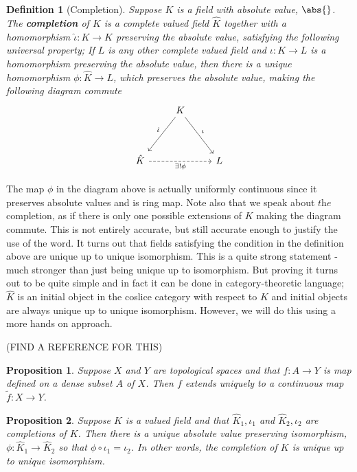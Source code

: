 \documentclass{article}
\newtheorem{definition}{Definition}[section]
\newtheorem{proposition}{Proposition}[section]
\begin{document}
\begin{definition}[Completion]
    Suppose $K$ is a field with absolute value, $\abs{}$. The \textbf{completion} of $K$ is a complete valued field $\hat K$ together with a homomorphism $\hat \iota : K \to \hat K$ preserving the absolute value, satisfying the following universal property; If $L$ is any other complete valued field and $\iota : K \to L$ is a homomorphism preserving the absolute value, then there is a unique homomorphism $\phi : \hat K \to L$, which preserves the absolute value, making the following diagram commute
    \[\begin{tikzcd}
        & K \\
        \\
        \hat K && L
        \arrow["{\exists! \phi}"', dashed, from=3-1, to=3-3]
        \arrow["{\hat \iota}"', from=1-2, to=3-1]
	    \arrow["{\iota}", from=1-2, to=3-3]
    \end{tikzcd}\]
\end{definition}
The map $\phi$ in the diagram above is actually uniformly continuous since it preserves absolute values and is ring map. Note also that we speak about $\textit{the}$ completion, as if there is only one possible extensions of $K$ making the diagram commute. This is not entirely accurate, but still accurate enough to justify the use of the word. It turns out that fields satisfying the condition in the definition above are unique up to unique isomorphism. This is a quite strong statement - much stronger than just being unique up to isomorphism. But proving it turns out to be quite simple and in fact it can be done in category-theoretic language; $\hat K$ is an initial object in the coslice category with respect to $K$ and initial objects are always unique up to unique isomorphism. However, we will do this using a more hands on approach.


(FIND A REFERENCE FOR THIS)
\begin{proposition}
    Suppose $X$ and $Y$ are topological spaces and that $f : A \to Y$ is map defined on a dense subset $A$ of $X$. Then $f$ extends uniquely to a continuous map $\tilde f : X \to Y$.
\end{proposition}

\begin{proposition}
    Suppose $K$ is a valued field and that $\hat K_1, \iota_1$ and $\hat K_2, \iota_2$ are completions of $K$. Then there is a unique absolute value preserving isomorphism, $\phi : \hat K_1 \to \hat K_2$ so that $\phi \circ \iota_1 = \iota_2$. In other words, the completion of $K$ is unique up to unique isomorphism.
\end{proposition}
\end{document}

